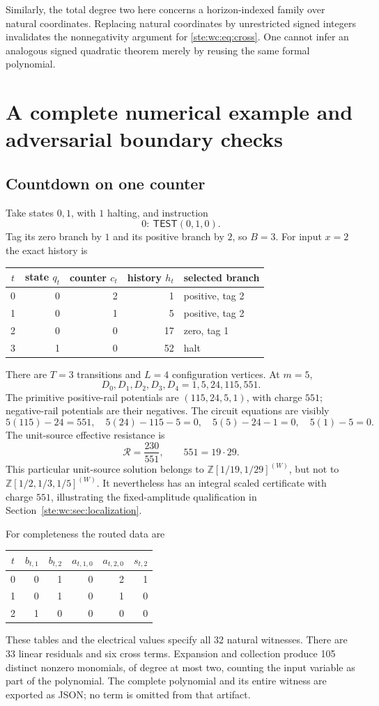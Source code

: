 \documentclass[11pt,letterpaper]{article}
\theoremstyle{definition}
\theoremstyle{remark}
\newcommand{\Z}{\mathbb Z}
\newcommand{\test}{\mathsf{TEST}}
\begin{document}
Similarly, the total degree two here concerns a horizon-indexed family over
natural coordinates. Replacing natural coordinates by unrestricted signed
integers invalidates the nonnegativity argument for \eqref{ste:wc:eq:cross}.
One cannot infer an analogous signed quadratic theorem merely by
reusing the same formal polynomial.

\section{A complete numerical example and adversarial boundary checks}
\label{ste:wc:sec:example}

\subsection{Countdown on one counter}
Take states $0,1$, with $1$ halting, and instruction
\[
 0:\ \test(0,1,0).
\]
Tag its zero branch by $1$ and its positive branch by $2$, so $B=3$.
For input $x=2$ the exact history is
\begin{center}
\begin{tabular}{@{}crrrl@{}}
\toprule
$t$ & state $q_t$ & counter $c_t$ & history $h_t$ & selected branch\\
\midrule
0&0&2&1&positive, tag 2\\
1&0&1&5&positive, tag 2\\
2&0&0&17&zero, tag 1\\
3&1&0&52&halt\\
\bottomrule
\end{tabular}
\end{center}
There are $T=3$ transitions and $L=4$ configuration vertices. At $m=5$,
\[
 D_0,D_1,D_2,D_3,D_4=1,5,24,115,551.
\]
The primitive positive-rail potentials are $(115,24,5,1)$, with charge
$551$; negative-rail potentials are their negatives. The circuit equations
are visibly
\[
 5(115)-24=551,\quad5(24)-115-5=0,\quad
 5(5)-24-1=0,\quad5(1)-5=0.
\]
The unit-source effective resistance is
\[
 \mathcal R=\frac{230}{551},\qquad551=19\cdot29.
\]
This particular unit-source solution belongs to
$\Z[1/19,1/29]^{(W)}$, but not to $\Z[1/2,1/3,1/5]^{(W)}$.
It nevertheless has an integral scaled certificate with charge $551$,
illustrating the fixed-amplitude qualification in Section~\ref{ste:wc:sec:localization}.

For completeness the routed data are
\begin{center}
\begin{tabular}{@{}crrrrr@{}}
\toprule
$t$&$b_{t,1}$&$b_{t,2}$&$a_{t,1,0}$&$a_{t,2,0}$&$s_{t,2}$\\
\midrule
0&0&1&0&2&1\\
1&0&1&0&1&0\\
2&1&0&0&0&0\\
\bottomrule
\end{tabular}
\end{center}
These tables and the electrical values specify all 32 natural witnesses.
There are 33 linear residuals and six cross terms. Expansion and collection
produce 105 distinct nonzero monomials, of degree at most two, counting the
input variable as part of the polynomial. The complete polynomial and its
entire witness are exported as JSON; no term is omitted from that artifact.
\end{document}
